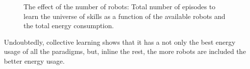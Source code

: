 \begin{figure}[!t]
	\centering
	\hspace*{\fill}
	\hfill	
	\hspace*{\fill}
	\hspace*{\fill}
	\caption[] {\label{fig:final_results} The effect of the number of robots:  Total number of episodes to learn the universe of skills as a function of the available robots and  the total energy consumption.}
\end{figure}

Undoubtedly, collective learning shows that it has a not only the best energy usage of all the paradigms, but, inline the rest, the more robots are included the better energy usage. 

